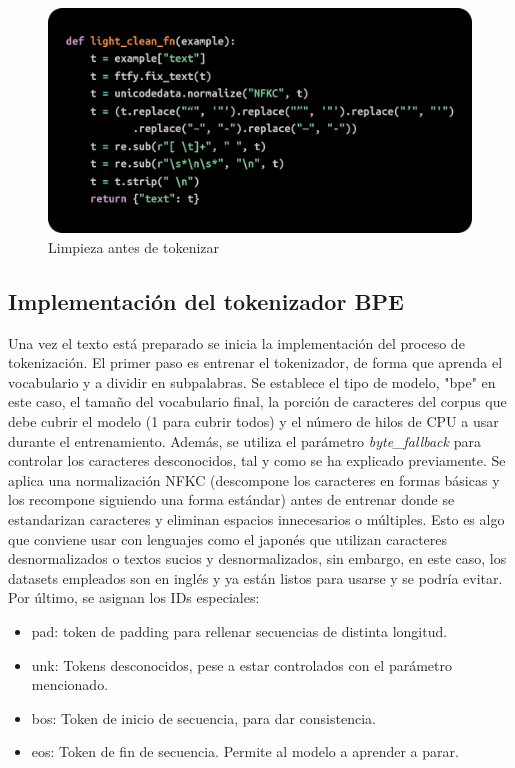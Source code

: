 \documentclass[11pt]{book}
\begin{document}
\begin{figure}[h]
    \centering
    \includegraphics[width=0.5\linewidth]{img/preclean.png}
    \caption{Limpieza antes de tokenizar}
    \label{fig:placeholder2}
\end{figure}

\subsection{Implementación del tokenizador BPE}
Una vez el texto está preparado se inicia la implementación del proceso de tokenización. El primer paso es entrenar el tokenizador, de forma que aprenda el vocabulario y a dividir en subpalabras. Se establece el tipo de modelo, "bpe" en este caso, el tamaño del vocabulario final, la porción de caracteres del corpus que debe cubrir el modelo (1 para cubrir todos) y el número de hilos de CPU a usar durante el entrenamiento. Además, se utiliza el parámetro \textit{byte\_fallback} para controlar los caracteres desconocidos, tal y como se ha explicado previamente. Se aplica una normalización NFKC (descompone los caracteres en formas básicas y los recompone siguiendo una forma estándar) antes de entrenar donde se estandarizan caracteres y eliminan espacios innecesarios o múltiples. Esto es algo que conviene usar con lenguajes como el japonés que utilizan caracteres desnormalizados o textos sucios y desnormalizados, sin embargo, en este caso, los datasets empleados son en inglés y ya están listos para usarse y se podría evitar. Por último, se asignan los IDs especiales:

 \begin{itemize}
     \item pad: token de padding para rellenar secuencias de distinta longitud.
     \item unk: Tokens desconocidos, pese a estar controlados con el parámetro mencionado.
     \item bos: Token de inicio de secuencia, para dar consistencia.
     \item eos: Token de fin de secuencia. Permite al modelo a aprender a parar.
 \end{itemize}
 
\end{document}
